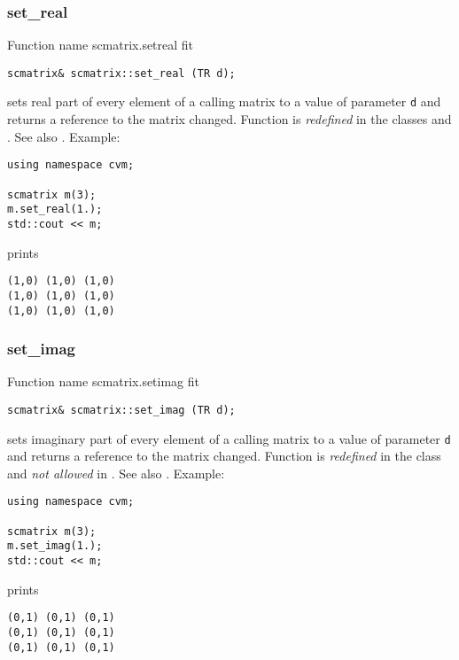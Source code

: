 \subsubsection{set\_real}
Function%
\pdfdest name {scmatrix.setreal} fit
\begin{verbatim}
scmatrix& scmatrix::set_real (TR d);
\end{verbatim}
sets real part of every element of a calling matrix to a value of
parameter \verb"d"
and returns a reference to the matrix changed.
Function is \emph{redefined} in the classes
and .
See also .
Example:
\begin{Verbatim}
using namespace cvm;

scmatrix m(3);
m.set_real(1.);
std::cout << m;
\end{Verbatim}
prints
\begin{Verbatim}
(1,0) (1,0) (1,0)
(1,0) (1,0) (1,0)
(1,0) (1,0) (1,0)
\end{Verbatim}
\newpage





\subsubsection{set\_imag}
Function%
\pdfdest name {scmatrix.setimag} fit
\begin{verbatim}
scmatrix& scmatrix::set_imag (TR d);
\end{verbatim}
sets imaginary part of every element of a calling matrix to a value of
parameter \verb"d"
and returns a reference to the matrix changed.
Function is \emph{redefined} in the class
and \emph{not allowed} in .
See also .
Example:
\begin{Verbatim}
using namespace cvm;

scmatrix m(3);
m.set_imag(1.);
std::cout << m;
\end{Verbatim}
prints
\begin{Verbatim}
(0,1) (0,1) (0,1)
(0,1) (0,1) (0,1)
(0,1) (0,1) (0,1)
\end{Verbatim}
\newpage





